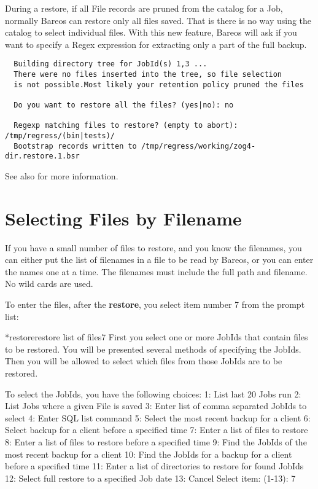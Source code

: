   During a restore, if all File records are pruned from the catalog
  for a Job, normally Bareos can restore only all files saved. That
  is there is no way using the catalog to select individual files.
  With this new feature, Bareos will ask if you want to specify a Regex
  expression for extracting only a part of the full backup.

\begin{verbatim}
  Building directory tree for JobId(s) 1,3 ...
  There were no files inserted into the tree, so file selection
  is not possible.Most likely your retention policy pruned the files

  Do you want to restore all the files? (yes|no): no

  Regexp matching files to restore? (empty to abort): /tmp/regress/(bin|tests)/
  Bootstrap records written to /tmp/regress/working/zog4-dir.restore.1.bsr
\end{verbatim}

  See also  for more information.

\section{Selecting Files by Filename}

If you have a small number of files to restore, and you know the filenames,
you can either put the list of filenames in a file to be read by Bareos, or
you can enter the names one at a time. The filenames must include the full
path and filename. No wild cards are used.

To enter the files, after the {\bf restore}, you select item number 7 from the
prompt list:

\begin{bconsole}{*}{restore}{restore list of files}{7}
First you select one or more JobIds that contain files
to be restored. You will be presented several methods
of specifying the JobIds. Then you will be allowed to
select which files from those JobIds are to be restored.

To select the JobIds, you have the following choices:
     1: List last 20 Jobs run
     2: List Jobs where a given File is saved
     3: Enter list of comma separated JobIds to select
     4: Enter SQL list command
     5: Select the most recent backup for a client
     6: Select backup for a client before a specified time
     7: Enter a list of files to restore
     8: Enter a list of files to restore before a specified time
     9: Find the JobIds of the most recent backup for a client
    10: Find the JobIds for a backup for a client before a specified time
    11: Enter a list of directories to restore for found JobIds
    12: Select full restore to a specified Job date
    13: Cancel
Select item:  (1-13): 7
\end{bconsole}


